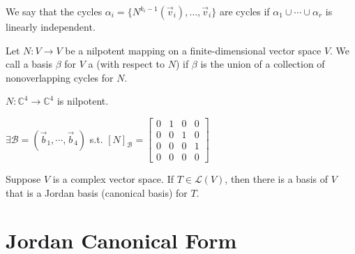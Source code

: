 \documentclass[11pt,fleqn]{book} %
\begin{document}
\setcounter{definitionT}{4}
\begin{definition}
    We say that the cycles $\alpha_i = \{ N^{k_i-1}(\vec{v}_i), \dots, \vec{v}_i \}$ are  cycles if $\alpha_1 \cup \cdots \cup \alpha_r$ is linearly independent. 
\end{definition}

\setcounter{definitionT}{6}
\begin{definition}
    Let $N: V \to V$ be a nilpotent mapping on a finite-dimensional vector space $V$. We call a basis $\beta$ for $V$ a  (with respect to $N$) if $\beta$ is the union of a collection of nonoverlapping cycles for $N$.
\end{definition}
\setcounter{chapter}{4}

\begin{example}
    $N: \mathbb{C}^4 \to \mathbb{C}^4$ is nilpotent.

    $\exists \mathcal{B} = (\vec{b}_1, \cdots, \vec{b}_4)$ s.t. $[N]_\mathcal{B} = \begin{bmatrix} 0 &1 &0 &0 \\ 0 &0 &1 &0 \\ 0 &0 &0 &1 \\ 0 &0 &0 &0 \end{bmatrix}$
\end{example}

\begin{theorem}
    Suppose $V$ is a complex vector space. If $T \in \mathcal{L}(V)$, then there is a basis of $V$ that is a Jordan basis (canonical basis) for $T$.
\end{theorem}

\section{Jordan Canonical Form}
\end{document}

